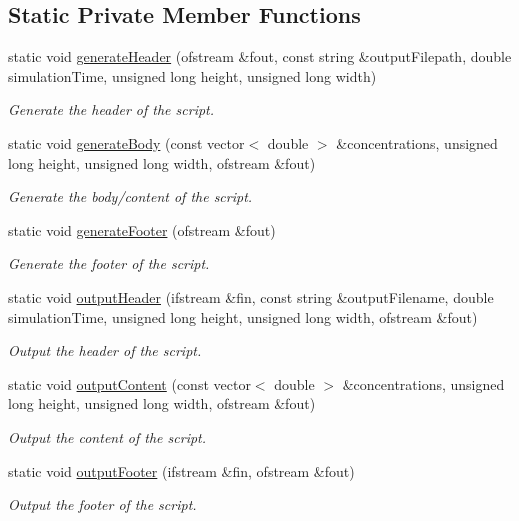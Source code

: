 \subsection*{Static Private Member Functions}
\begin{DoxyCompactItemize}
\item 
static void \hyperlink{classmultiscale_1_1video_1_1RectangularGnuplotScriptGenerator_abe3a62a21428183cdaf91c405c59264f}{generate\-Header} (ofstream \&fout, const string \&output\-Filepath, double simulation\-Time, unsigned long height, unsigned long width)
\begin{DoxyCompactList}\small\item\em Generate the header of the script. \end{DoxyCompactList}\item 
static void \hyperlink{classmultiscale_1_1video_1_1RectangularGnuplotScriptGenerator_ae8464c4b7b05d86ea8bcbfa5a26f7374}{generate\-Body} (const vector$<$ double $>$ \&concentrations, unsigned long height, unsigned long width, ofstream \&fout)
\begin{DoxyCompactList}\small\item\em Generate the body/content of the script. \end{DoxyCompactList}\item 
static void \hyperlink{classmultiscale_1_1video_1_1RectangularGnuplotScriptGenerator_a0b37e76bc9d825de0fd9d168f15a56be}{generate\-Footer} (ofstream \&fout)
\begin{DoxyCompactList}\small\item\em Generate the footer of the script. \end{DoxyCompactList}\item 
static void \hyperlink{classmultiscale_1_1video_1_1RectangularGnuplotScriptGenerator_a4b0c7a7b1e0b21dd2a432787ce8830d0}{output\-Header} (ifstream \&fin, const string \&output\-Filename, double simulation\-Time, unsigned long height, unsigned long width, ofstream \&fout)
\begin{DoxyCompactList}\small\item\em Output the header of the script. \end{DoxyCompactList}\item 
static void \hyperlink{classmultiscale_1_1video_1_1RectangularGnuplotScriptGenerator_a74e7f2fee2df4fc22a9ee3f1caee4e71}{output\-Content} (const vector$<$ double $>$ \&concentrations, unsigned long height, unsigned long width, ofstream \&fout)
\begin{DoxyCompactList}\small\item\em Output the content of the script. \end{DoxyCompactList}\item 
static void \hyperlink{classmultiscale_1_1video_1_1RectangularGnuplotScriptGenerator_a58ff6a7a353edb0dcda39ac8f1bac1c3}{output\-Footer} (ifstream \&fin, ofstream \&fout)
\begin{DoxyCompactList}\small\item\em Output the footer of the script. \end{DoxyCompactList}\end{DoxyCompactItemize}
